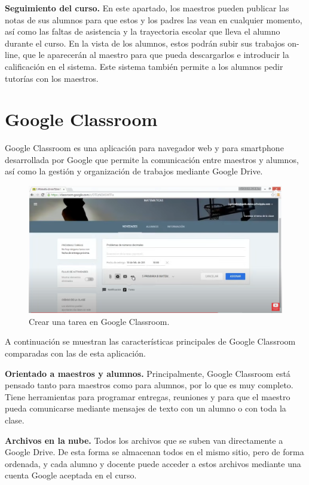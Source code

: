 \textbf {Seguimiento del curso.}
    En este apartado, los maestros pueden publicar las notas de sus alumnos para que estos y los padres las vean en cualquier momento, así como las faltas de asistencia y la trayectoria escolar que lleva el alumno durante el curso.
    En la vista de los alumnos, estos podrán subir sus trabajos on-line, que le aparecerán al maestro para que pueda descargarlos e introducir la calificación en el sistema. Este sistema también permite a los alumnos pedir tutorías con los maestros.


\section{Google Classroom}

Google Classroom es una aplicación para navegador web y para smartphone\cite{googleclassroom} desarrollada por Google que permite la comunicación entre maestros y alumnos, así como la gestión y organización de trabajos mediante Google Drive.

\begin{figure}[h]
\centering\includegraphics[width=1\linewidth]{figs/googleclassroom.png}
\caption{Crear una tarea en Google Classroom.\cite{googleclassroomyoutube}}
\label{Fig:googleclassroom}
\end{figure}

A continuación se muestran las características principales de Google Classroom comparadas con las de esta aplicación.

\textbf {Orientado a maestros y alumnos.} Principalmente, Google Classroom está pensado tanto para maestros como para alumnos, por lo que es muy completo. Tiene herramientas para programar entregas, reuniones y para que el maestro pueda comunicarse mediante mensajes de texto con un alumno o con toda la clase.

\textbf {Archivos en la nube.} Todos los archivos que se suben van directamente a Google Drive. De esta forma se almacenan todos en el mismo sitio, pero de forma ordenada, y cada alumno y docente puede acceder a estos archivos mediante una cuenta Google aceptada en el curso. 

